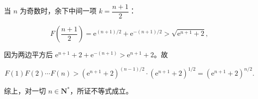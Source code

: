 \begin{answer}
当 $n$ 为奇数时，余下中间一项 $k=\dfrac{n+1}2$：

\nopagebreak[4]
\[F\left(\frac{n+1}2\right)=\mathrm e^{(n+1)/2}+\mathrm e^{-(n+1)/2}>\sqrt{\mathrm e^{n+1}+2},\]

因为两边平方后 $\mathrm e^{n+1}+2+\mathrm e^{-(n+1)}>\mathrm e^{n+1}+2$。故

\nopagebreak[4]
\[F(1)F(2)\cdots F(n)>\left(\mathrm e^{n+1}+2\right)^{(n-1)/2}\cdot\left(\mathrm e^{n+1}+2\right)^{1/2}=\left(\mathrm e^{n+1}+2\right)^{n/2}.\]

综上，对一切 $n\in\mathbf N^*$，所证不等式成立。


\end{answer}